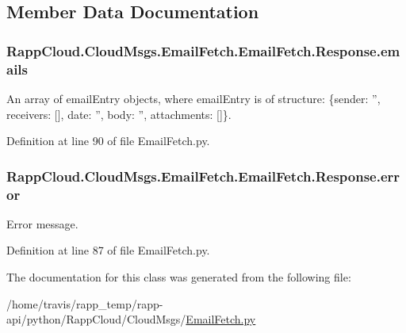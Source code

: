 \subsection{Member Data Documentation}
\hypertarget{classRappCloud_1_1CloudMsgs_1_1EmailFetch_1_1EmailFetch_1_1Response_a352f4b262dfdc78b7640bd01803d3e84}{
\subsubsection[{emails}]{\setlength{\rightskip}{0pt plus 5cm}Rapp\-Cloud.\-Cloud\-Msgs.\-Email\-Fetch.\-Email\-Fetch.\-Response.\-emails}}\label{classRappCloud_1_1CloudMsgs_1_1EmailFetch_1_1EmailFetch_1_1Response_a352f4b262dfdc78b7640bd01803d3e84}


An array of email\-Entry objects, where email\-Entry is of structure\-: \{sender\-: '', receivers\-: \mbox{[}\mbox{]}, date\-: '', body\-: '', attachments\-: \mbox{[}\mbox{]}\}. 



Definition at line 90 of file Email\-Fetch.\-py.

\hypertarget{classRappCloud_1_1CloudMsgs_1_1EmailFetch_1_1EmailFetch_1_1Response_a916a99b8a1d1ae9068299e7ea05d5c63}{
\subsubsection[{error}]{\setlength{\rightskip}{0pt plus 5cm}Rapp\-Cloud.\-Cloud\-Msgs.\-Email\-Fetch.\-Email\-Fetch.\-Response.\-error}}\label{classRappCloud_1_1CloudMsgs_1_1EmailFetch_1_1EmailFetch_1_1Response_a916a99b8a1d1ae9068299e7ea05d5c63}


Error message. 



Definition at line 87 of file Email\-Fetch.\-py.



The documentation for this class was generated from the following file\-:\begin{DoxyCompactItemize}
\item 
/home/travis/rapp\-\_\-temp/rapp-\/api/python/\-Rapp\-Cloud/\-Cloud\-Msgs/\hyperlink{EmailFetch_8py}{Email\-Fetch.\-py}\end{DoxyCompactItemize}
